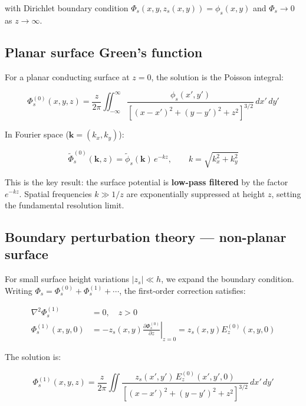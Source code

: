 \documentclass[11pt,a4paper]{article}
\begin{document}
with Dirichlet boundary condition $\Phi_s(x,y,z_s(x,y)) = \phi_s(x,y)$ and
$\Phi_s \to 0$ as $z \to \infty$.

\subsection{Planar surface Green's function}

For a planar conducting surface at $z = 0$, the solution is the Poisson integral:

\begin{equation}
\Phi_s^{(0)}(x,y,z) = \frac{z}{2\pi}
    \iint_{-\infty}^{\infty} \frac{\phi_s(x',y')}
    {[(x-x')^2 + (y-y')^2 + z^2]^{3/2}}\,dx'\,dy'
\label{eq:poisson_kernel}
\end{equation}

In Fourier space ($\mathbf{k} = (k_x, k_y)$):

\begin{equation}
\tilde{\Phi}_s^{(0)}(\mathbf{k}, z) = \tilde{\phi}_s(\mathbf{k})\,e^{-kz},
\qquad k = \sqrt{k_x^2 + k_y^2}
\label{eq:fourier_poisson}
\end{equation}

This is the key result: the surface potential is \textbf{low-pass filtered} by
the factor $e^{-kz}$. Spatial frequencies $k \gg 1/z$ are exponentially suppressed
at height $z$, setting the fundamental resolution limit.

\subsection{Boundary perturbation theory — non-planar surface}

For small surface height variations $|z_s| \ll h$, we expand the boundary
condition. Writing $\Phi_s = \Phi_s^{(0)} + \Phi_s^{(1)} + \cdots$, the
first-order correction satisfies:

\begin{align}
\nabla^2\Phi_s^{(1)} &= 0, \quad z > 0 \\
\Phi_s^{(1)}(x,y,0) &= -z_s(x,y)\left.\frac{\partial\Phi_s^{(0)}}{\partial z}\right|_{z=0}
                    = z_s(x,y)E_z^{(0)}(x,y,0)
\label{eq:perturbation_bc}
\end{align}

The solution is:

\begin{equation}
\Phi_s^{(1)}(x,y,z) = \frac{z}{2\pi}\iint
    \frac{z_s(x',y')\,E_z^{(0)}(x',y',0)}
    {[(x-x')^2 + (y-y')^2 + z^2]^{3/2}}\,dx'\,dy'
\label{eq:first_order}
\end{equation}
\end{document}
